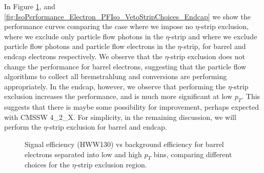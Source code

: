 In Figure \ref{fig:IsoPerformance_Electron_PFIso_VetoStripChoices_Barrel},
and \ref{fig:IsoPerformance_Electron_PFIso_VetoStripChoices_Endcap} we show the
performance curves comparing the case where we impose no $\eta$-strip exclusion,
where we exclude only particle flow photons in the $\eta$-strip and where we
exclude particle flow photons and particle flow electrons in the $\eta$-strip,
for barrel and endcap electrons respectively. We observe that the  $\eta$-strip
exclusion does not change the performance for barrel electrons, suggesting that
the particle flow algorithms to collect all bremstrahlung and conversions
are performing appropriately. In the endcap, however, we observe that performing
the $\eta$-strip exclusion increases the performance, and is much more 
significant at low $p_{T}$. This suggests that there is maybe some 
possibility for improvement, perhaps expected with CMSSW 4\_2\_X. For simplicity,
in the remaining discussion, we will perform the $\eta$-strip exclusion for barrel
and endcap. 

 \begin{figure}[!htbp]
\begin{center}
\caption{Signal efficiency (HWW130) vs background efficiency for barrel electrons separated into 
low and high $p_{T}$ bins, comparing different choices for the $\eta$-strip exclusion region.}
\label{fig:IsoPerformance_Electron_PFIso_VetoStripChoices_Barrel}
\end{center}
\end{figure}

